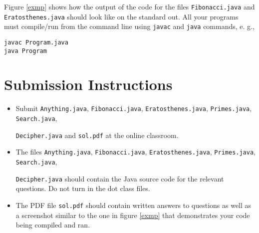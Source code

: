 \documentclass{homework}
\begin{document}
Figure \ref{exmp} shows how the output of the code for the files
\texttt{Fibonacci.java} and \texttt{Eratosthenes.java} should look
like on the standard out. All your programs must compile/run from
the command line using \texttt{javac} and \texttt{java} commands,
e. g.,

\begin{verbatim}
javac Program.java
java Program
\end{verbatim}


\section{Submission Instructions}

\begin{itemize}
  \item Submit \texttt{Anything.java}, \texttt{Fibonacci.java},
        \texttt{Eratosthenes.java}, \texttt{Primes.java},
        \texttt{Search.java},

        \noindent\texttt{Decipher.java} and
        \texttt{sol.pdf} at the online classroom.

  \item The files \texttt{Anything.java}, \texttt{Fibonacci.java},
        \texttt{Eratosthenes.java}, \texttt{Primes.java},
        \texttt{Search.java},

        \noindent\texttt{Decipher.java} should contain the
        Java source code for the relevant questions. Do not turn in the dot class files.

  \item The PDF file \texttt{sol.pdf} should contain written answers to
        questions as well as a screenshot similar to the one in figure \ref{exmp}
        that demonstrates your code being compiled and ran.
\end{itemize}
\end{document}

